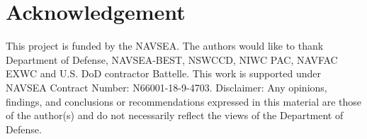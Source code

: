 \documentclass[10pt,journal,a4paper,twoside]{./IMEJ}
\begin{document}

%






\section*{Acknowledgement}
This project is funded by the NAVSEA. The authors would like to thank Department of Defense, NAVSEA-BEST, NSWCCD, NIWC PAC, NAVFAC EXWC and U.S. DoD contractor Battelle. This work is supported under NAVSEA Contract Number: N66001-18-9-4703.\newline
Disclaimer:
Any opinions, findings, and conclusions or recommendations expressed in this material are those of the author(s) and do not necessarily reflect the views of the Department of Defense.
\end{document}

